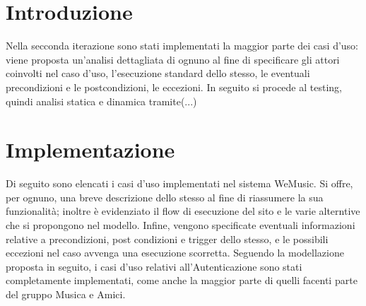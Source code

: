 \section{Introduzione}
Nella secconda iterazione sono stati implementati la maggior parte dei casi d'uso: viene proposta 
un'analisi dettagliata di ognuno al fine di specificare gli attori coinvolti nel caso d'uso, l'esecuzione
standard dello stesso, le eventuali precondizioni e le postcondizioni, le eccezioni.
In seguito si procede al testing, quindi analisi statica e dinamica tramite(...)


\newpage
\section{Implementazione}
Di seguito sono elencati i casi d'uso implementati nel sistema WeMusic. Si offre, per ognuno, una breve descrizione dello stesso 
al fine di riassumere la sua funzionalità; inoltre è evidenziato il flow di esecuzione del sito e le varie alterntive che si propongono nel modello.
Infine, vengono specificate eventuali informazioni relative a precondizioni, post condizioni e trigger dello stesso, e le possibili eccezioni nel 
caso avvenga una esecuzione scorretta. 
Seguendo la modellazione proposta in seguito, i casi d'uso relativi all'Autenticazione sono stati completamente implementati, come anche 
la maggior parte di quelli facenti parte del gruppo Musica e Amici. 

\vspace{1cm}
